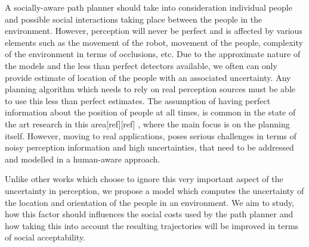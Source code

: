 
A socially-aware path planner should take into consideration individual people and possible social interactions taking place between the people in the environment. However, perception will never be perfect and is affected by various elements such as the movement of the robot, movement of the people, complexity of the environment in terms of occlusions, etc. Due to the approximate nature of the models and the less than perfect detectors available, we often can only provide estimate of location of the people with an associated uncertainty. Any planning algorithm which needs to rely on real perception sources must be able to use this less than perfect estimates. The assumption of having perfect information about the position of people at all times, is common in the state of the art research in this area[ref][ref] , where the main focus is on the planning itself. However, moving to real applications, poses serious challenges in terms of noisy perception information and high uncertainties, that need to be addressed and modelled in a human-aware approach.


Unlike other works which choose to ignore this very important aspect of the uncertainty in perception, we propose a model which computes the uncertainty of the location and orientation of the people in an environment. We aim to study, how this factor should influences the social costs used by the path planner and how taking this into account the resulting trajectories will be improved in terms of social acceptability.

